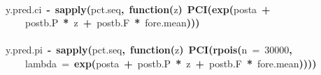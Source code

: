 \documentclass{article}
\makeatletter
\newcommand{\hlnumber}[1]{\textcolor[rgb]{0,0,0}{#1}}%
\newcommand{\hlfunctioncall}[1]{\textcolor[rgb]{.5,0,.33}{\textbf{#1}}}%
\newcommand{\hlkeyword}[1]{\textbf{#1}}%
\newcommand{\hlargument}[1]{\textcolor[rgb]{.69,.25,.02}{#1}}%
\newcommand{\hlformalargs}[1]{\hlargument{#1}}%
\newcommand{\hlassignement}[1]{\textbf{#1}}%
\newcommand{\hlsymbol}[1]{#1}%
\newcommand{\hlstd}[1]{\textcolor[rgb]{0,0,0}{#1}}%
\newenvironment{kframe}{%
 \def\FrameCommand##1{\hskip\@totalleftmargin \hskip-\fboxsep
 \colorbox{shadecolor}{##1}\hskip-\fboxsep
     \hskip-\linewidth \hskip-\@totalleftmargin \hskip\columnwidth}%
 \MakeFramed {\advance\hsize-\width
   \@totalleftmargin\z@ \linewidth\hsize
   \@setminipage}}%
 {\par\unskip\endMakeFramed}
\newenvironment{knitrout}{}{} %
\makeatother
\begin{document}
\begin{knitrout}
{\begin{kframe}
\begin{flushleft}
\hlstd{}\hspace*{\fill}\\
\hlstd{}\hlsymbol{y.pred.ci}{\ }\hlassignement{\usebox{\hlnormalsizeboxlessthan}-}{\ }\hlfunctioncall{sapply}\hlkeyword{(}\hlsymbol{pct.seq}\hlkeyword{,}{\ }\hlkeyword{function}\hlkeyword{(}\hlformalargs{z}\hlkeyword{)}{\ }\hlfunctioncall{PCI}\hlkeyword{(}\hlfunctioncall{exp}\hlkeyword{(}\hlsymbol{post}\hlkeyword{\usebox{\hlnormalsizeboxdollar}}\hlsymbol{a}{\ }\hlkeyword{+}\hspace*{\fill}\\
\hlstd{}{\ }{\ }{\ }{\ }\hlsymbol{post}\hlkeyword{\usebox{\hlnormalsizeboxdollar}}\hlsymbol{b.P}{\ }\hlkeyword{*}{\ }\hlsymbol{z}{\ }\hlkeyword{+}{\ }\hlsymbol{post}\hlkeyword{\usebox{\hlnormalsizeboxdollar}}\hlsymbol{b.F}{\ }\hlkeyword{*}{\ }\hlsymbol{fore.mean}\hlkeyword{)}\hlkeyword{)}\hlkeyword{)}\hspace*{\fill}\\
\hlstd{}\hspace*{\fill}\\
\hlstd{}\hlsymbol{y.pred.pi}{\ }\hlassignement{\usebox{\hlnormalsizeboxlessthan}-}{\ }\hlfunctioncall{sapply}\hlkeyword{(}\hlsymbol{pct.seq}\hlkeyword{,}{\ }\hlkeyword{function}\hlkeyword{(}\hlformalargs{z}\hlkeyword{)}{\ }\hlfunctioncall{PCI}\hlkeyword{(}\hlfunctioncall{rpois}\hlkeyword{(}\hlargument{n}{\ }\hlargument{=}{\ }\hlnumber{30000}\hlkeyword{,}\hspace*{\fill}\\
\hlstd{}{\ }{\ }{\ }{\ }\hlargument{lambda}{\ }\hlargument{=}{\ }\hlfunctioncall{exp}\hlkeyword{(}\hlsymbol{post}\hlkeyword{\usebox{\hlnormalsizeboxdollar}}\hlsymbol{a}{\ }\hlkeyword{+}{\ }\hlsymbol{post}\hlkeyword{\usebox{\hlnormalsizeboxdollar}}\hlsymbol{b.P}{\ }\hlkeyword{*}{\ }\hlsymbol{z}{\ }\hlkeyword{+}{\ }\hlsymbol{post}\hlkeyword{\usebox{\hlnormalsizeboxdollar}}\hlsymbol{b.F}{\ }\hlkeyword{*}{\ }\hlsymbol{fore.mean}\hlkeyword{)}\hlkeyword{)}\hlkeyword{)}\hlkeyword{)}\mbox{}
\normalfont
\end{flushleft}
\end{kframe}}
\end{knitrout}
\end{document}
